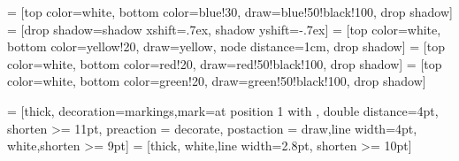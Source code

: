 \documentclass[a4paper,12pt,landscape]{article}
\begin{document}
\thispagestyle{empty}

\usetikzlibrary{positioning}
\usetikzlibrary{shadows}
\usetikzlibrary{arrows, decorations.markings}

 = [top color=white, bottom color=blue!30, 
                            draw=blue!50!black!100, drop shadow]
 = [drop shadow={shadow xshift=.7ex, 
                                 shadow yshift=-.7ex}]
 = [top color=white, bottom color=yellow!20, 
                               draw=yellow, node distance=1cm, drop shadow]
 = [top color=white, bottom color=red!20, 
                                  draw=red!50!black!100, drop shadow]
 = [top color=white, bottom color=green!20, 
                         draw=green!50!black!100, drop shadow]

 = [thick, decoration={markings,mark=at position
   1 with {}},
   double distance=4pt, shorten >= 11pt,
   preaction = {decorate},
   postaction = {draw,line width=4pt, white,shorten >= 9pt}]
 = [thick, white,line width=2.8pt, shorten >= 10pt]
\end{document}
